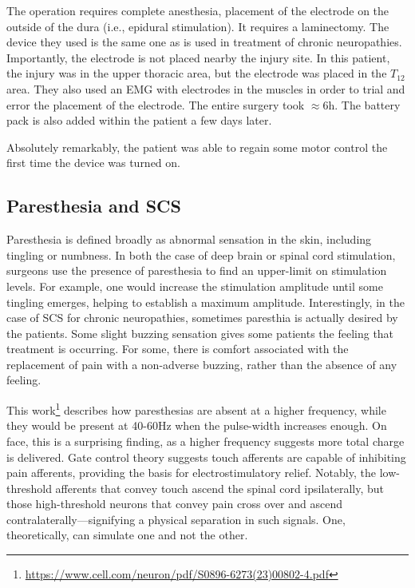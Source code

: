 The operation requires complete anesthesia, placement of the electrode on the outside of the dura (i.e., epidural stimulation). It requires a laminectomy. The device they used is the same one as is used in treatment of chronic neuropathies. Importantly, the electrode is not placed nearby the injury site. In this patient, the injury was in the upper thoracic area, but the electrode was placed in the $T_{12}$ area. They also used an EMG with electrodes in the muscles in order to trial and error the placement of the electrode. The entire surgery took $\approx 6$h. The battery pack is also added within the patient a few days later.\newline

Absolutely remarkably, the patient was able to regain some motor control the first time the device was turned on. 


\subsection{Paresthesia and SCS}

Paresthesia is defined broadly as abnormal sensation in the skin, including tingling or numbness. In both the case of deep brain or spinal cord stimulation, surgeons use the presence of paresthesia to find an upper-limit on stimulation levels. For example, one would increase the stimulation amplitude until some tingling emerges, helping to establish a maximum amplitude. Interestingly, in the case of SCS for chronic neuropathies, sometimes paresthia is actually desired by the patients. Some slight buzzing sensation gives some patients the feeling that treatment is occurring. For some, there is comfort associated with the replacement of pain with a non-adverse buzzing, rather than the absence of any feeling.\newline

This work\footnote{\url{https://www.cell.com/neuron/pdf/S0896-6273(23)00802-4.pdf}} describes how paresthesias are absent at a higher frequency, while they would be present at 40-60Hz when the pulse-width increases enough. On face, this is a surprising finding, as a higher frequency suggests more total charge is delivered. Gate control theory suggests touch afferents are capable of inhibiting pain afferents, providing the basis for electrostimulatory relief. Notably, the low-threshold afferents that convey touch ascend the spinal cord ipsilaterally, but those high-threshold neurons that convey pain cross over and ascend contralaterally---signifying a physical separation in such signals. One, theoretically, can simulate one and not the other.\newline

